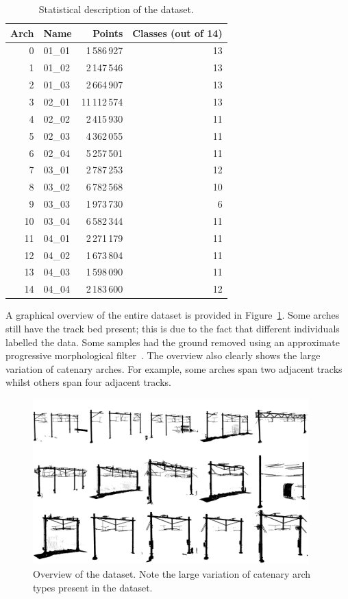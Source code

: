 \begin{table}[ht]
    \centering
    \begin{tabular}{rlrr}
        \toprule
        Arch & Name & Points & Classes (out of 14)\\
        \midrule
        0 & 01\_01 & 1\,586\,927 & 13\\
        1 & 01\_02 & 2\,147\,546 & 13\\
        2 & 01\_03 & 2\,664\,907 & 13\\
        3 & 02\_01 & 11\,112\,574 & 13\\
        4 & 02\_02 & 2\,415\,930 & 11\\
        5 & 02\_03 & 4\,362\,055 & 11\\
        6 & 02\_04 & 5\,257\,501 & 11\\
        7 & 03\_01 & 2\,787\,253 & 12\\
        8 & 03\_02 & 6\,782\,568 & 10\\
        9 & 03\_03 & 1\,973\,730 & 6\\
        10& 03\_04 & 6\,582\,344 & 11\\
        11& 04\_01 & 2\,271\,179 & 11\\
        12& 04\_02 & 1\,673\,804 & 11\\
        13& 04\_03 & 1\,598\,090 & 11\\
        14& 04\_04 & 2\,183\,600 & 12\\
        \bottomrule
    \end{tabular}
    \caption{Statistical description of the dataset.}
    \label{tbl:semseg:stats}
\end{table}

A graphical overview of the entire dataset is provided in Figure~\ref{fig:semseg:overview}. Some arches still have the track bed present; this is due to the fact that different individuals labelled the data. Some samples had the ground removed using an approximate progressive morphological filter~\cite{keqi.03}. The overview also clearly shows the large variation of catenary arches. For example, some arches span two adjacent tracks whilst others span four adjacent tracks.

\begin{figure}[ht]
    \centering
    \includegraphics[width=0.95\textwidth]{./Chapters/semseg/figs/dataset_overview.png}
    \caption{Overview of the dataset. Note the large variation of catenary arch types present in the dataset.}
    \label{fig:semseg:overview}
\end{figure}

